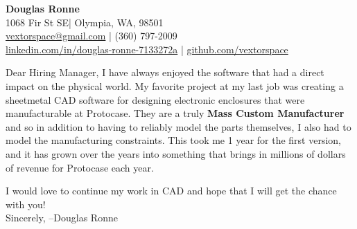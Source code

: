 \documentclass[letter,12pt]{article}
\begin{document}
\begin{center}
    {\Huge \textbf{Douglas Ronne}}\\
    \vspace{2mm}
    1068 Fir St SE| Olympia, WA, 98501\\
    \href{mailto:vextorspace@gmail.com}{vextorspace@gmail.com} | (360) 797-2009\\
    \href{www.linkedin.com/in/douglas-ronne-7133272a}{linkedin.com/in/douglas-ronne-7133272a} | \href{https://github.com/vextorspace}{github.com/vextorspace}
\end{center}

Dear Hiring Manager,
  I have always enjoyed the software that had a direct impact on the physical world. My favorite project at my last job was creating a sheetmetal CAD software for designing electronic enclosures that were manufacturable at Protocase. They are a truly \textbf{Mass Custom Manufacturer} and so in addition to having to reliably model the parts themselves, I also had to model the manufacturing constraints. This took me 1 year for the first version, and it has grown over the years into something that brings in millions of dollars of revenue for Protocase each year.

I would love to continue my work in CAD and hope that I will get the chance with you!
\\
Sincerely,
--Douglas Ronne
\end{document}

